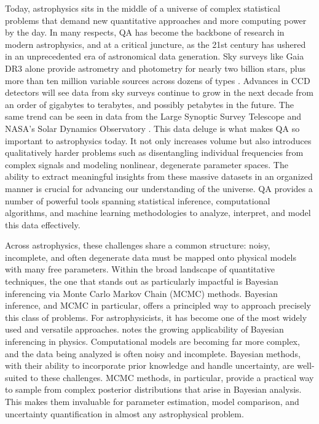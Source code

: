 \documentclass[twocolumn,linenumbers]{aastex631}
\begin{document}
Today, astrophysics sits in the middle of a universe of complex statistical problems that demand new quantitative approaches and more computing power by the day. In many respects, QA has become the backbone of research in modern astrophysics, and at a critical juncture, as the 21st century has ushered in an unprecedented era of astronomical data generation. Sky surveys like  Gaia DR3 alone provide astrometry and photometry for nearly two billion stars, plus more than ten million variable sources across dozens of types \citep{gaiacollaborationGaiaDataRelease2023}. Advances in CCD detectors will see data from sky surveys continue to grow in the next decade from an order of gigabytes to terabytes, and possibly petabytes in the future. The same trend can be seen in data from the Large Synoptic Survey Telescope and NASA's Solar Dynamics Observatory \citep{borneAstroinformatics21stCentury2009}. This data deluge is what makes QA so important to astrophysics today. It not only increases volume but also introduces qualitatively harder problems such as disentangling individual frequencies from complex signals and modeling nonlinear, degenerate parameter spaces. The ability to extract meaningful insights from these massive datasets in an organized manner is crucial for advancing our understanding of the universe. QA provides a number of powerful tools spanning statistical inference, computational algorithms, and machine learning methodologies to analyze, interpret, and model this data effectively.

Across astrophysics, these challenges share a common structure: noisy, incomplete, and often degenerate data must be mapped onto physical models with many free parameters. Within the broad landscape of quantitative techniques, the one that stands out as particularly impactful is Bayesian inferencing via Monte Carlo Markov Chain (MCMC) methods. Bayesian inference, and MCMC in particular, offers a principled way to approach precisely this class of problems. For astrophysicists, it has become one of the most widely used and versatile approaches. \citet{vontoussaintBayesianInferencePhysics2011} notes the growing applicability of Bayesian inferencing in physics. Computational models are becoming far more complex, and the data being analyzed is often noisy and incomplete. Bayesian methods, with their ability to incorporate prior knowledge and handle uncertainty, are well-suited to these challenges. MCMC methods, in particular, provide a practical way to sample from complex posterior distributions that arise in Bayesian analysis. This makes them invaluable for parameter estimation, model comparison, and uncertainty quantification in almost any astrophysical problem.
\end{document}
